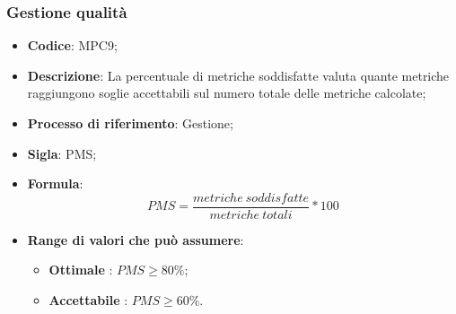\subsubsection{Gestione qualità}
\vspace{-1cm}
\begin{itemize}
	\item \textbf{Codice}: MPC9;
	\item \textbf{Descrizione}: La percentuale di metriche soddisfatte valuta quante metriche raggiungono soglie accettabili sul numero totale delle metriche calcolate;
	\item \textbf{Processo di riferimento}: Gestione;
	\item \textbf{Sigla}: PMS;
	\item \textbf{Formula}: \[ PMS = \frac{metriche \ soddisfatte}{metriche \ totali} \ast 100\]
	\item \textbf{Range di valori che può assumere}: 
		\begin{itemize}
			\item \textbf{Ottimale} : $PMS \geq 80 \%$;
			\item \textbf{Accettabile} : $PMS \geq 60 \%$.
		\end{itemize}
\end{itemize}